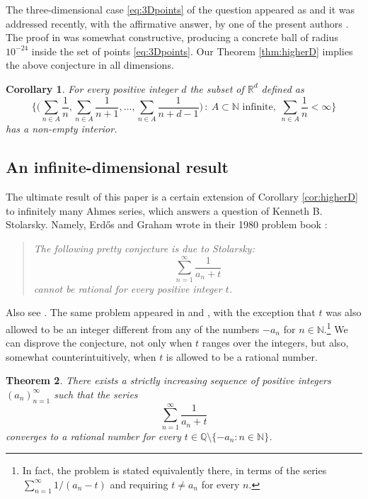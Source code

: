 \documentclass[11pt,letterpaper,reqno]{amsart}
\numberwithin{equation}{section}
\newtheorem{theorem}{Theorem}[section]
\newtheorem{corollary}[theorem]{Corollary}
\theoremstyle{definition}
\numberwithin{equation}{section}
\begin{document}
The three-dimensional case \eqref{eq:3Dpoints} of the question appeared as \cite[Problem \#268]{EP} and it was addressed recently, with the affirmative answer, by one of the present authors \cite{Kov24}. The proof in \cite{Kov24} was somewhat constructive, producing a concrete ball of radius $10^{-24}$ inside the set of points \eqref{eq:3Dpoints}.
Our Theorem \ref{thm:higherD} implies the above conjecture in all dimensions.

\begin{corollary}
For every positive integer $d$ the subset of $\mathbb{R}^d$ defined as
\[ \bigg\{ \Big(\sum_{n\in A}\frac{1}{n}, \sum_{n\in A}\frac{1}{n+1}, \ldots, \sum_{n\in A}\frac{1}{n+d-1}\Big) \,:\ A\subset\mathbb{N} \text{ infinite},\ \sum_{n\in A}\frac{1}{n}<\infty \bigg\} \]
has a non-empty interior.
\end{corollary}


\subsection{An infinite-dimensional result}
The ultimate result of this paper is a certain extension of Corollary \ref{cor:higherD} to infinitely many Ahmes series, which answers a question of Kenneth B. Stolarsky. Namely, Erd\H{o}s and Graham wrote in their 1980 problem book \cite[p.~64]{EG80}:
\begin{quote}
\emph{The following pretty conjecture is due to Stolarsky:
\[ \sum_{n=1}^{\infty}\frac{1}{a_n+t} \]
cannot be rational for every positive integer $t$.}
\end{quote}
Also see \cite[Problem \#266]{EP}.
The same problem appeared in \cite[p.~334]{Erd85} and \cite[p.~104]{Erd88}, with the exception that $t$ was also allowed to be an integer different from any of the numbers $-a_n$ for $n\in\mathbb{N}$.\footnote{In fact, the problem is stated equivalently there, in terms of the series $\sum_{n=1}^{\infty} 1/(a_n-t)$ and requiring $t\neq a_n$ for every $n$.}
We can disprove the conjecture, not only when $t$ ranges over the integers, but also, somewhat counterintuitively, when $t$ is allowed to be a rational number.

\begin{theorem}\label{thm:Stolarsky}
There exists a strictly increasing sequence of positive integers $(a_n)_{n=1}^{\infty}$ such that the series
\[ \sum_{n=1}^{\infty}\frac{1}{a_n+t} \]
converges to a rational number for every $t\in\mathbb{Q}\setminus\{-a_n:n\in\mathbb{N}\}$.
\end{theorem}
\end{document}
